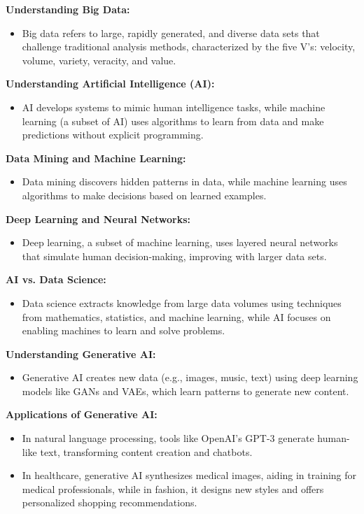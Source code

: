 \documentclass[12pt]{report} %
\begin{document}
			
		\noindent \textbf{Understanding Big Data:}
		\begin{itemize}
			\item Big data refers to large, rapidly generated, and diverse data sets that challenge traditional analysis methods, characterized by the five V's: velocity, volume, variety, veracity, and value.
		\end{itemize}
		
		\noindent \textbf{Understanding Artificial Intelligence (AI):}
		\begin{itemize}
			\item AI develops systems to mimic human intelligence tasks, while machine learning (a subset of AI) uses algorithms to learn from data and make predictions without explicit programming.
		\end{itemize}
		
		\noindent \textbf{Data Mining and Machine Learning:}
		\begin{itemize}
			\item Data mining discovers hidden patterns in data, while machine learning uses algorithms to make decisions based on learned examples.
		\end{itemize}
		
		\noindent \textbf{Deep Learning and Neural Networks:}
		\begin{itemize}
			\item Deep learning, a subset of machine learning, uses layered neural networks that simulate human decision-making, improving with larger data sets.
		\end{itemize}
		
		\noindent \textbf{AI vs. Data Science:}
		\begin{itemize}
			\item Data science extracts knowledge from large data volumes using techniques from mathematics, statistics, and machine learning, while AI focuses on enabling machines to learn and solve problems.
		\end{itemize}
		
		\noindent \textbf{Understanding Generative AI:}
		\begin{itemize}
			\item Generative AI creates new data (e.g., images, music, text) using deep learning models like GANs and VAEs, which learn patterns to generate new content.
		\end{itemize}
		
		\noindent \textbf{Applications of Generative AI:}
		\begin{itemize}
			\item In natural language processing, tools like OpenAI’s GPT-3 generate human-like text, transforming content creation and chatbots.
			\item In healthcare, generative AI synthesizes medical images, aiding in training for medical professionals, while in fashion, it designs new styles and offers personalized shopping recommendations.
		\end{itemize}
		
\end{document}
